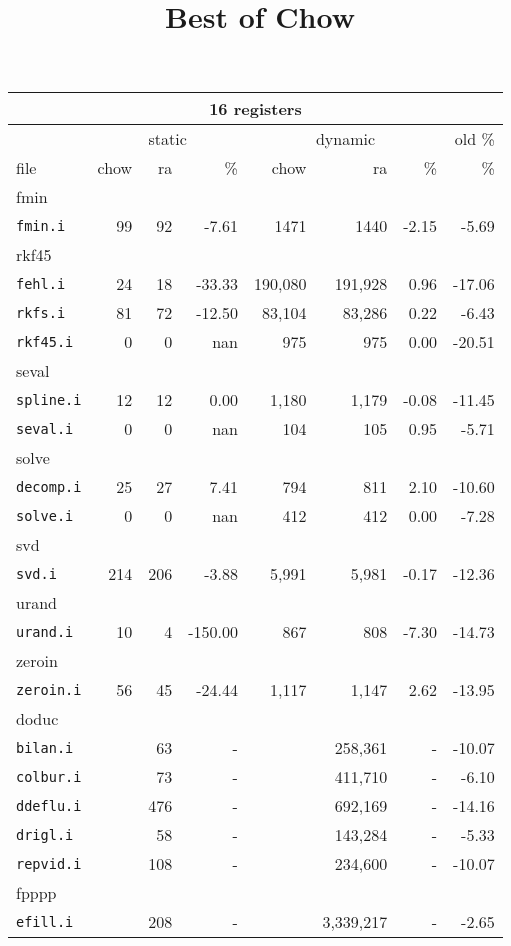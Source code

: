 \documentclass[11pt]{article}
\title{Best of Chow}
\begin{document}
\begin{tabular}{|l|r|r|r|r|r|r|r|}
\hline
\multicolumn{8}{|c|}{16 registers}\\
\hline
&\multicolumn{3}{c}{static}&\multicolumn{3}{|c|}{dynamic}&old \%\\
\hline
file&chow&ra&\%&chow&ra&\%&\%\\
\hline


%
%
\multicolumn{8}{|l|}{fmin}\\
\hline
\texttt{fmin.i}&99&92&-7.61&1471&1440&-2.15&-5.69 \\
\hline
%
%
\multicolumn{8}{|l|}{rkf45}\\
\hline
\texttt{fehl.i}&24&18&-33.33&190,080&191,928&0.96&-17.06 \\
\hline
\texttt{rkfs.i}&81&72&-12.50&83,104&83,286&0.22&-6.43 \\
\hline
\texttt{rkf45.i}&0&0&nan&975&975&0.00&-20.51 \\
\hline
%
%
\multicolumn{8}{|l|}{seval}\\
\hline
\texttt{spline.i}&12&12&0.00&1,180&1,179&-0.08&-11.45 \\
\hline
\texttt{seval.i}&0&0&nan&104&105&0.95&-5.71 \\
\hline
%
%
\multicolumn{8}{|l|}{solve}\\
\hline
\texttt{decomp.i}&25&27&7.41&794&811&2.10&-10.60 \\
\hline
\texttt{solve.i}&0&0&nan&412&412&0.00&-7.28 \\
\hline
%
%
\multicolumn{8}{|l|}{svd}\\
\hline
\texttt{svd.i}&214&206&-3.88&5,991&5,981&-0.17&-12.36 \\
\hline
%
%
\multicolumn{8}{|l|}{urand}\\
\hline
\texttt{urand.i}&10&4&-150.00&867&808&-7.30&-14.73 \\
\hline
%
%
\multicolumn{8}{|l|}{zeroin}\\
\hline
\texttt{zeroin.i}&56&45&-24.44&1,117&1,147&2.62&-13.95 \\
\hline
%
%
\multicolumn{8}{|l|}{doduc}\\
\hline
\texttt{bilan.i}&&63&-&&258,361&-&-10.07 \\
\hline
\texttt{colbur.i}&&73&-&&411,710&-&-6.10 \\
\hline
\texttt{ddeflu.i}&&476&-&&692,169&-&-14.16 \\
\hline
\texttt{drigl.i}&&58&-&&143,284&-&-5.33 \\
\hline
\texttt{repvid.i}&&108&-&&234,600&-&-10.07 \\
\hline
%
%
\multicolumn{8}{|l|}{fpppp}\\
\hline
\texttt{efill.i}&&208&-&&3,339,217&-&-2.65 \\
\hline


\end{tabular}
\end{document}
